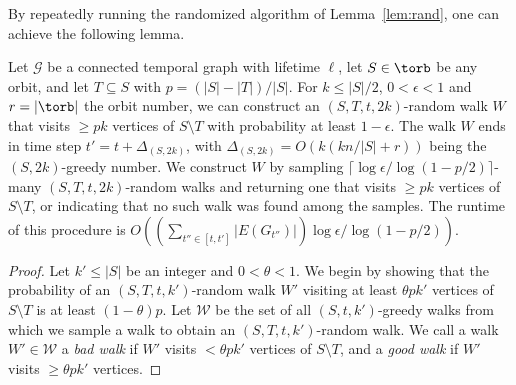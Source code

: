 {    By repeatedly running the randomized algorithm of Lemma~\ref{lem:rand}, one can
achieve the following lemma. 
{
\begin{lemma}\label{lem:randlog} Let $\mathcal{G}$ be a connected temporal
    graph with lifetime $\ell$, let $S \in \torb$ be any orbit, and let $T
    \subseteq S$ with $p=(|S|-|T|)/|S|$. For $k \leq |S|/2$,  $0 < \epsilon < 1$ and
    $r=|\torb|$ the orbit number, we
    can construct an $(S, T, t, 2k)$-random walk $W$ that visits $\geq p k$
    vertices of $S \setminus T$ with probability at least $1-\epsilon$. 
    The walk $W$ ends in time step $t'=t+\Delta_{(S, 2k)}$, with
    $\Delta_{(S, 2k)}=O(k(k n/|S|+r))$ being the $(S, 2k)$-greedy number.
    We construct $W$ by 
    sampling %
    {$\lceil \log\epsilon/\log(1-p/2) \rceil$-many
    $(S, T, t, 2k)$-random walks
    and returning one
    that visits $\geq pk$ vertices of $S\setminus T$, or indicating
    that no such walk was found among the samples}.
    The runtime of this procedure is $O((\sum_{t'' \in [t, t']}|E(G_{t''})|)
\log \epsilon/\log(1-p/2))$. 
\end{lemma}
\begin{proof}
    Let $k' \leq |S|$ be an integer and $0 < \theta < 1$.
    We begin by showing that the
    probability of an $(S, T, t, k')$-random walk $W'$ visiting at least $\theta
    pk'$ vertices of $S\setminus T$ is at least $(1-\theta)p$. 
    Let $\mathcal{W}$ be the set of all $(S, t, k')$-greedy walks
    from which we
    sample a walk to obtain an $(S, T, t, k')$-random walk. We call a walk $W'
    \in \mathcal{W}$ a \emph{bad walk} if $W'$ visits $< \theta p k'$ vertices
    of $S\setminus T$, and a \emph{good walk} if $W'$ visits $\geq \theta p k'$
    vertices. 


\end{proof}}}
